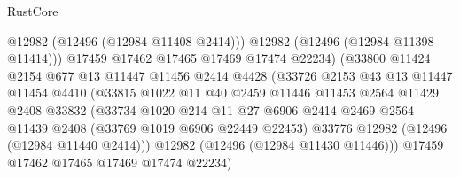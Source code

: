 \begin{lexlean}{RustCore}
\begin{coremodule}
                                    @12982
                                    (@12496 (@12984 @11408 @2414)))
                                  @12982
                                  (@12496 (@12984 @11398 @11414)))
                                @17459
                                @17462
                                @17465
                                @17469
                                @17474
                                @22234)
                              (@33800
                                @11424
                                @2154
                                @677
                                @13
                                @11447
                                @11456
                                @2414
                                @4428
                                (@33726
                                  @2153
                                  @43
                                  @13
                                  @11447
                                  @11454
                                  @4410
                                  (@33815
                                    @1022
                                    @11
                                    @40
                                    @2459
                                    @11446
                                    @11453
                                    @2564
                                    @11429
                                    @2408
                                    @33832
                                    (@33734
                                      @1020
                                      @214
                                      @11
                                      @27
                                      @6906
                                      @2414
                                      @2469
                                      @2564
                                      @11439
                                      @2408
                                      (@33769 @1019 @6906 @22449 @22453)
                                      @33776
                                      @12982
                                      (@12496 (@12984 @11440 @2414)))
                                    @12982
                                    (@12496 (@12984 @11430 @11446)))
                                  @17459
                                  @17462
                                  @17465
                                  @17469
                                  @17474
                                  @22234)

\end{coremodule}
\end{lexlean}

